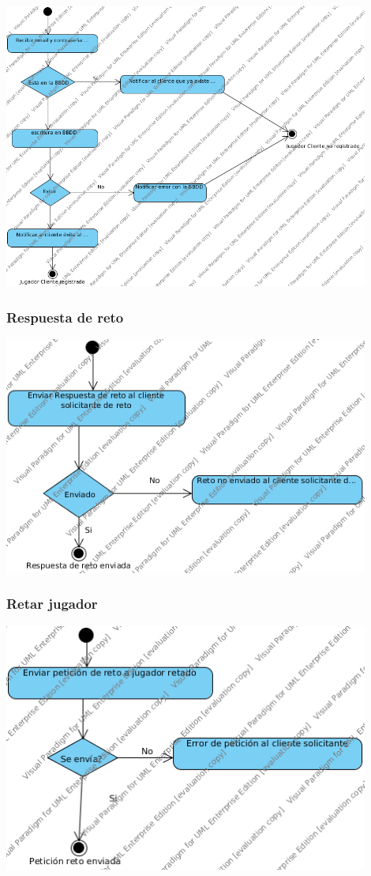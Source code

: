 \documentclass[a4paper,11pt,oneside]{article}
\begin{document}
\includegraphics[width=0.9\textwidth]{img/ms_RegistrarUsuarioServidor.png}\\[1cm]

\subsubsection{Respuesta de reto}

\includegraphics[width=0.9\textwidth]{img/ms_RespuestaRetoServidor.png}\\[1cm]

\subsubsection{Retar jugador}

\includegraphics[width=0.9\textwidth]{img/ms_RetarJugadorServidor.png}\\[1cm]
\end{document}

